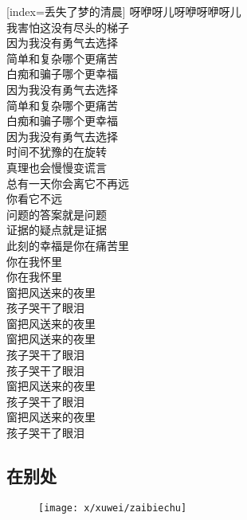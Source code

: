 \begin{songs}{}
  [index={丢失了梦的清晨}]
		呀咿呀儿呀咿呀咿呀儿	\\
		我害怕这没有尽头的梯子	\\
		因为我没有勇气去选择	\\
		简单和复杂哪个更痛苦	\\
		白痴和骗子哪个更幸福	\\
		因为我没有勇气去选择	\\
		简单和复杂哪个更痛苦	\\
		白痴和骗子哪个更幸福	\\
		因为我没有勇气去选择	\\
		时间不犹豫的在旋转	\\
		真理也会慢慢变谎言	\\
		总有一天你会离它不再远	\\
		你看它不远	\\
		问题的答案就是问题	\\
		证据的疑点就是证据	\\
		此刻的幸福是你在痛苦里	\\
		你在我怀里	\\
		你在我怀里	\\
		窗把风送来的夜里	\\
		孩子哭干了眼泪	\\
		窗把风送来的夜里	\\
		窗把风送来的夜里	\\
		孩子哭干了眼泪	\\
		孩子哭干了眼泪	\\
		窗把风送来的夜里	\\
		孩子哭干了眼泪	\\
		窗把风送来的夜里	\\
		孩子哭干了眼泪	\\
  \endsong
\end{songs}


	

\subsection{在别处}

\begin{figure}[htp]
	\begin{center}
	  \texttt{[image: x/xuwei/zaibiechu]}
	  \label{fig:zaibiechu}
	\end{center}
\end{figure}

